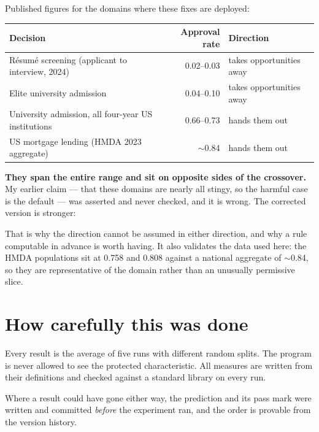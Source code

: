 \documentclass[11pt,a4paper]{article}
\begin{document}
Published figures for the domains where these fixes are deployed:

\begin{center}
\small
\begin{tabular}{lrl}
\toprule
Decision & Approval rate & Direction \\
\midrule
R\'esum\'e screening (applicant to interview, 2024) & 0.02--0.03 & takes opportunities away \\
Elite university admission & 0.04--0.10 & takes opportunities away \\
University admission, all four-year US institutions & 0.66--0.73 & hands them out \\
US mortgage lending (HMDA 2023 aggregate) & $\sim$0.84 & hands them out \\
\bottomrule
\end{tabular}
\end{center}

\textbf{They span the entire range and sit on opposite sides of the crossover.} My earlier
claim --- that these domains are nearly all stingy, so the harmful case is the default ---
was asserted and never checked, and it is wrong. The corrected version is stronger:

\begin{center}
\end{center}

That is why the direction cannot be assumed in either direction, and why a rule computable
in advance is worth having. It also validates the data used here: the HMDA populations sit
at 0.758 and 0.808 against a national aggregate of $\sim$0.84, so they are representative of
the domain rather than an unusually permissive slice.

\section{How carefully this was done}

Every result is the average of five runs with different random splits. The program is never
allowed to see the protected characteristic. All measures are written from their definitions
and checked against a standard library on every run.

Where a result could have gone either way, the prediction and its pass mark were written and
committed \emph{before} the experiment ran, and the order is provable from the version
history.
\end{document}
